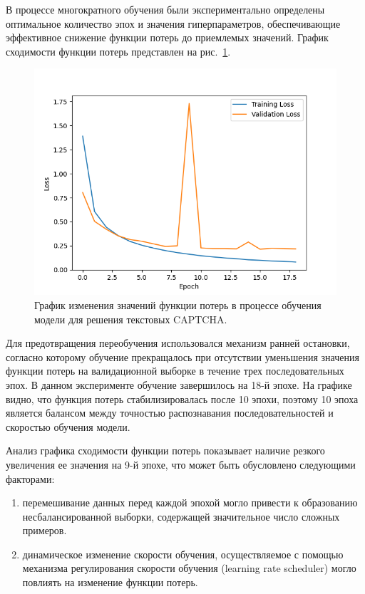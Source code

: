 В процессе многократного обучения были экспериментально определены оптимальное 
количество эпох и значения гиперпараметров, обеспечивающие эффективное снижение 
функции потерь до приемлемых значений. График сходимости функции потерь 
представлен на рис.~\ref{fig:loss}.

\begin{figure}[H]
    \centering
    \includegraphics[width=0.8\linewidth]{imgs/textcaptcha/Model_loss.png}
    \caption{График изменения значений функции потерь в процессе обучения модели для решения текстовых CAPTCHA.}
    \label{fig:loss}
\end{figure}
\vspace{-0.85cm}

Для предотвращения переобучения использовался механизм ранней остановки, согласно 
которому обучение прекращалось при отсутствии уменьшения значения функции потерь 
на валидационной выборке в течение трех последовательных эпох. В данном 
эксперименте обучение завершилось на 18-й эпохе. На графике видно, что функция 
потерь стабилизировалась после 10 эпохи, поэтому 10 эпоха является балансом между 
точностью распознавания последовательностей и скоростью обучения модели.

Анализ графика сходимости функции потерь показывает наличие резкого увеличения ее 
значения на 9-й эпохе, что может быть обусловлено следующими факторами:
\begin{enumerate}
    \item перемешивание данных перед каждой эпохой могло привести к образованию 
    несбалансированной выборки, содержащей значительное число сложных примеров.
    \item динамическое изменение скорости обучения, осуществляемое с помощью 
    механизма регулирования скорости обучения (learning rate scheduler) могло 
    повлиять на изменение функции потерь.
\end{enumerate}

